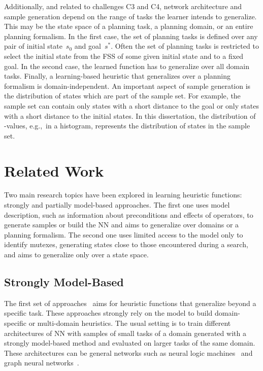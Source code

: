 Additionally, and related to challenges C3 and C4, network architecture and sample generation depend on the range of tasks the learner intends to generalize. This may be the state space of a planning task, a planning domain, or an entire planning formalism. In the first case, the set of planning tasks is defined over any pair of initial state~$s_0$ and goal~$s^*$. Often the set of planning tasks is restricted to select the initial state from the FSS of some given initial state and to a fixed goal. In the second case, the learned function has to generalize over all domain tasks. Finally, a learning-based heuristic that generalizes over a planning formalism is domain-independent. An important aspect of sample generation is the distribution of states which are part of the sample set. For example, the sample set can contain only states with a short distance to the goal or only states with a short distance to the initial states. In this dissertation, the distribution of \hstar-values, e.g.,~in a histogram, represents the distribution of states in the sample set.

\section{Related Work}
\label{sec:related-work}

Two main research topics have been explored in learning heuristic functions: strongly and partially model-based approaches. The first one uses model description, such as information about preconditions and effects of operators, to generate samples or build the NN and aims to generalize over domains or a planning formalism. The second one uses limited access to the model only to identify mutexes, generating states close to those encountered during a search, and aims to generalize only over a state space.

\subsection{Strongly Model-Based}
\label{sec:related-work-strongly}

The first set of approaches~\cite{toyer2018action,toyer2020asnets,shen2020learning,stahlberg2022learning,gehring2022reinforcement} aims for heuristic functions that generalize beyond a specific task. These approaches strongly rely on the model to build domain-specific or multi-domain heuristics. The usual setting is to train different architectures of NN with samples of small tasks of a domain generated with a strongly model-based method and evaluated on larger tasks of the same domain. These architectures can be general networks such as neural logic machines~\cite{dong2018neural} and graph neural networks~\cite{scarselli2008graph,gori2005new}.

